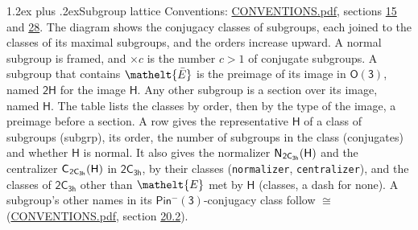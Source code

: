 \documentclass[10pt,a4paper]{article}
\makeatletter
\renewcommand\section{\@startsection{section}{1}{\z@}{-3ex plus -1ex minus -.2ex}%
  {1.2ex plus .2ex}{\normalfont\large\sffamily\bfseries\color{parttitle}}}
\numberwithin{equation}{section}
\newcommand{\eltfont}[1]{{\let\sigma\eltsigma\mathelt{#1}}}
\newcommand{\grp}[1]{\mathsf{#1}}
\newcommand{\cls}[1]{\eltfont{#1}}
\newcommand{\elt}[1]{\eltfont{#1}}
\newcommand{\samecls}{\cong}
\newcommand{\barred}[1]{\bar{#1}}
\newcommand{\hairsp}{\mkern1mu}
\makeatother
\begin{document}
\section{Subgroup lattice}\label{s:subgroups}
Conventions: \href{../../CONVENTIONS.pdf}{CONVENTIONS.pdf}, sections \href{../../../rotation/CONVENTIONS.pdf\#conv.15}{15} and \href{../../CONVENTIONS.pdf\#conv.28}{28}.
The diagram shows the conjugacy classes of subgroups, each joined to the classes of its maximal subgroups, and the orders increase upward. \label{n:index.conjugates.c}A normal subgroup is framed, and ${\times}c$ is the number $c > 1$ of conjugate subgroups. \label{n:group.H}A subgroup that contains $\elt{\barred{E}}$ is the preimage of its image in $\grp{O(3)}$, named $\grp{2H}$ for the image $\grp{H}$. Any other subgroup is a section over its image, named $\grp{H}$. The table lists the classes by order, then by the type of the image, a preimage before a section. \label{n:head.subgroup}\label{n:head.order}\label{n:head.conjugates}\label{n:head.normal}A row gives the representative $\grp{H}$ of a class of subgroups (subgrp), its order, the number of subgroups in the class (conjugates) and whether $\grp{H}$ is normal. \label{n:group.normalizer}\label{n:group.centralizer}\label{n:head.classes}It also gives the normalizer $\grp{N}_{\hairsp \grp{2C_{3h}}}(\grp{H})$ and the centralizer $\grp{C}_{\hairsp \grp{2C_{3h}}}(\grp{H})$ in $\grp{2C_{3h}}$, by their classes (\texttt{normalizer}, \texttt{centralizer}), and the classes of $\grp{2C_{3h}}$ other than $\cls{E}$ met by $\grp{H}$ (classes, a dash for none). A subgroup's other names in its \href{Pinminus3.pdf}{$\grp{Pin^{-}(3)}$}-conjugacy class follow $\samecls$ (\href{../../CONVENTIONS.pdf}{CONVENTIONS.pdf}, section \href{../../CONVENTIONS.pdf\#conv.20.2}{20.2}).
\begin{center}
\end{center}
\end{document}
